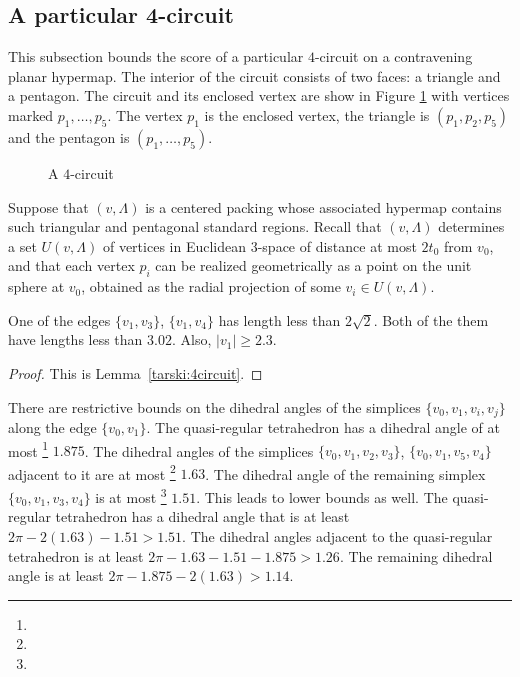 \subsection{A particular 4-circuit} %

This subsection bounds the score of a particular $4$-circuit on a
contravening planar hypermap.  The interior of the circuit
consists of two faces: a triangle and a pentagon.  The circuit and
its enclosed vertex are show in Figure \ref{fig:no4circuit} with
vertices marked $p_1,\ldots,p_5$.  The vertex $p_1$ is the
enclosed vertex, the triangle is $(p_1,p_2,p_5)$ and the pentagon
is $(p_1,\ldots,p_5)$.

\begin{figure}[htb]
  \centering
  \caption{A $4$-circuit}
  \label{fig:no4circuit}
\end{figure}

Suppose that $(v,\Lambda)$ is a centered packing whose associated hypermap
contains such triangular and pentagonal standard regions. Recall
that $(v,\Lambda)$ determines a set $U(v,\Lambda)$ of vertices in Euclidean
$3$-space of distance at most $2t_0$ from $v_0$, and that
each vertex $p_i$ can be realized geometrically as a point on the
unit sphere at $v_0$, obtained as the radial projection of
some $v_i\in U(v,\Lambda)$.

\begin{lemma}  
One of the edges $\{v_1,v_3\}$, $\{v_1,v_4\}$ has
length less than $2\sqrt{2}$.  Both of the them have lengths less
than $3.02$. Also, $|v_1|\ge2.3$.
\end{lemma}

\begin{proof} This is Lemma~\ref{tarski:4circuit}.
\end{proof}


There are restrictive bounds on the dihedral angles of the
simplices $\{v_0,v_1,v_i,v_j\}$ along the edge $\{v_0,v_1\}$. The
quasi-regular tetrahedron has a dihedral angle of at most%
\footnote{} $1.875$.  The dihedral angles of the
simplices $\{v_0,v_1,v_2,v_3\}$, $\{v_0,v_1,v_5,v_4\}$
adjacent to it are at most%
\footnote{}  $1.63$. The dihedral angle of the
remaining simplex $\{v_0,v_1,v_3,v_4\}$ is at most%
\footnote{} $1.51$.   This leads to lower bounds
as well. The quasi-regular tetrahedron has a dihedral angle that
is at least $2\pi - 2(1.63)-1.51 > 1.51$.  The dihedral angles
adjacent to the quasi-regular tetrahedron is at least $2\pi-
1.63-1.51-1.875> 1.26$. The remaining dihedral angle is at least
$2\pi-1.875-2(1.63) > 1.14$.

